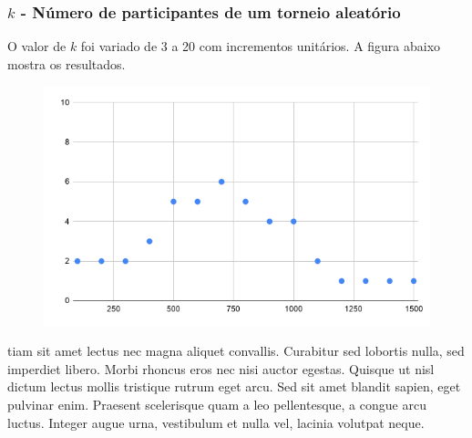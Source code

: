 \documentclass{article}
\begin{document}
\subsubsection{$k$ - Número de participantes de um torneio aleatório}
\quad O valor de $k$ foi variado de 3 a 20 com incrementos unitários. A figura abaixo mostra os resultados.
\begin{figure}[H]
\centering
\includegraphics[scale=0.35]{placeholder}
\end{figure}
\quad tiam sit amet lectus nec magna aliquet convallis. Curabitur sed lobortis nulla, sed imperdiet libero. Morbi rhoncus eros nec nisi auctor egestas. Quisque ut nisl dictum lectus mollis tristique rutrum eget arcu. Sed sit amet blandit sapien, eget pulvinar enim. Praesent scelerisque quam a leo pellentesque, a congue arcu luctus. Integer augue urna, vestibulum et nulla vel, lacinia volutpat neque.
\end{document}
